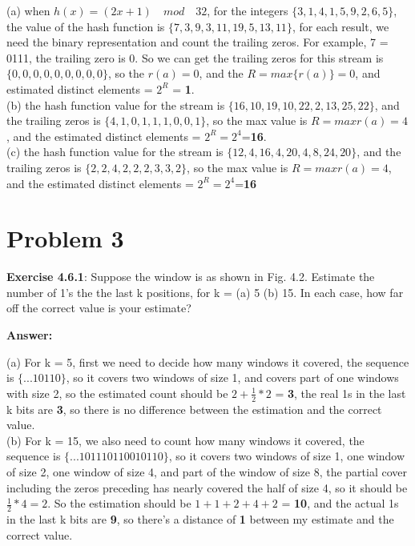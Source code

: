 \documentclass{article}
\begin{document}
(a) when $h(x) = (2x + 1) \quad mod \quad 32$, for the integers $\{3, 1, 4, 1, 5, 9, 2, 6, 5\}$, the value of the hash function is $\{7, 3, 9, 3, 11, 19, 5, 13, 11\}$, for each result, we need the binary representation and count the trailing zeros. For example, 7 = 0111, the trailing zero is 0. So we can get the trailing zeros for this stream is $\{0, 0, 0, 0, 0, 0, 0, 0, 0\}$, so the $r(a)=0$, and the $R=max\{r(a)\}=0$, and estimated distinct elements = $2^R$ = \textbf{1}.\\


(b) the hash function value for the stream is $\{16, 10, 19, 10, 22, 2, 13, 25, 22\}$, and the trailing zeros is $\{4, 1, 0, 1, 1, 1, 0, 0, 1\}$, so the max value is $R=max{r(a)}=4$, and the estimated distinct elements = $2^R = 2^4 $=\textbf{16}.\\


(c) the hash function value for the stream is $\{12, 4, 16, 4, 20, 4, 8, 24, 20\}$, and the trailing zeros is $\{2, 2, 4, 2, 2, 2, 3, 3, 2\}$, so the max value is $R=max{r(a)}=4$, and the estimated distinct elements = $2^R = 2^4 $=\textbf{16}




\section{Problem 3}

\textbf{Exercise 4.6.1}: Suppose the window is as shown in Fig. 4.2. Estimate the number of 1’s the the last k positions, for k = (a) 5 (b) 15. In each case, how far off the correct value is your estimate?

\textbf{Answer:}

(a) For k = 5, first we need to decide how many windows it covered, the sequence is $\{...1 0 1 1 0\}$, so it covers two windows of size 1, and covers part of one windows with size 2, so the estimated count should be $2 + \frac{1}{2} * 2 $ = \textbf{3}, the real 1s in the last k bits are \textbf{3}, so there is no difference between the estimation and the correct value. \\

(b) For k = 15, we also need to count how many windows it covered, the sequence is $\{...1 0 1 1 1 0 1 1 0 0 1 0 1 1 0\}$, so it covers two windows of size 1, one window of size 2, one window of size 4, and part of the window of size 8, the partial cover including the zeros preceding has nearly covered the half of size 4, so it should be $\frac{1}{2} * 4 = 2$. So the estimation should be $1 + 1 + 2 + 4 + 2 $ = \textbf{10}, and the actual 1s in the last k bits are \textbf{9}, so there's a distance of \textbf{1} between my estimate and the correct value.
\end{document}
